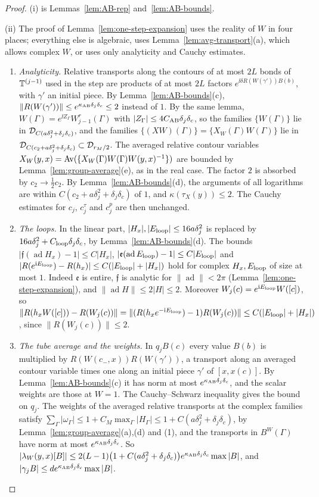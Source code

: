 \begin{proof}
(i) is Lemmas~\ref{lem:AB-rep} and~\ref{lem:AB-bounds}.

(ii) The proof of Lemma~\ref{lem:one-step-expansion} uses the reality of $W$ in four places; everything else is algebraic, uses Lemma~\ref{lem:avg-transport}(a), which allows complex $W$, or uses only analyticity and Cauchy estimates.
\begin{enumerate}[label=(\arabic*)]
\item \emph{Analyticity.} Relative transports along the contours of at most $2L$ bonds of $\mathbb T^{(j-1)}$ used in the step are products of at most $2L$ factors $e^{\ii\delta R(W(\gamma'))B(b)}$, with $\gamma'$ an initial piece. By Lemma~\ref{lem:AB-bounds}(c), $\|R(W(\gamma'))\|\le e^{\kappa_{\rm AB}\delta_j\delta_c}\le2$ instead of $1$. By the same lemma, $W(\Gamma)=e^{\ii Z_\Gamma}W^r_{j-1}(\Gamma)$ with $|Z_\Gamma|\le4C_{\rm AB}\delta_j\delta_c$, so the families $\{W(\Gamma)\}$ lie in $\mathcal D_{C(a\delta_j^2+\delta_j\delta_c)}$, and the families $\{(XW)(\Gamma)\}=\{X_W(\Gamma)W(\Gamma)\}$ lie in $\mathcal D_{C(c_2+a\delta_j^2+\delta_j\delta_c)}\subset\mathcal D_{r_M/2}$. The averaged relative contour variables $X_W(y,x)=\operatorname{Av}(\{X_W(\Gamma)W(\Gamma)W(y,x)^{-1}\})$ are bounded by Lemma~\ref{lem:group-average}(e), as in the real case. The factor $2$ is absorbed by $c_2\to\frac12c_2$. By Lemma~\ref{lem:AB-bounds}(d), the arguments of all logarithms are within $C(c_2+a\delta_j^2+\delta_j\delta_c)$ of $1$, and $\kappa(\tau_X(y))\le2$. The Cauchy estimates for $c_j$, $c^\tau_j$ and $c^p_j$ are then unchanged.
\item \emph{The loops.} In the linear part, $|H_x|,|E_{\rm loop}|\le16a\delta_j^2$ is replaced by $16a\delta_j^2+C_{\rm loop}\delta_j\delta_c$, by Lemma~\ref{lem:AB-bounds}(d). The bounds $|\mathfrak f(\operatorname{ad}H_x)-1|\le C|H_x|$, $|\mathfrak e(\operatorname{ad}E_{\rm loop})-1|\le C|E_{\rm loop}|$ and $|R(e^{\mathrm i E_{\rm loop}})-R(h_x)|\le C(|E_{\rm loop}|+|H_x|)$ hold for complex $H_x,E_{\rm loop}$ of size at most $1$. Indeed $\mathfrak e$ is entire, $\mathfrak f$ is analytic for $\|\operatorname{ad}\|<2\pi$ (Lemma~\ref{lem:one-step-expansion}), and $\|\operatorname{ad}H\|\le2|H|\le2$. Moreover $W_j(c)=e^{\mathrm i E_{\rm loop}}W([c])$, so $\|R(h_xW([c]))-R(W_j(c))\|=\|(R(h_xe^{-\mathrm i E_{\rm loop}})-1)R(W_j(c))\|\le C(|E_{\rm loop}|+|H_x|)$, since $\|R(W_j(c))\|\le2$.
\item \emph{The tube average and the weights.} In $q_jB(c)$ every value $B(b)$ is multiplied by $R(W(c_-,x))R(W(\gamma'))$, a transport along an averaged contour variable times one along an initial piece $\gamma'$ of $[x,x(c)]$. By Lemma~\ref{lem:AB-bounds}(c) it has norm at most $e^{\kappa_{\rm AB}\delta_j\delta_c}$, and the scalar weights are those at $W=1$. The Cauchy--Schwarz inequality gives the bound on $q_j$. The weights of the averaged relative transports at the complex families satisfy $\sum_\Gamma|\omega_\Gamma|\le1+C_M\max_\Gamma|H_\Gamma|\le1+C(a\delta_j^2+\delta_j\delta_c)$, by Lemma~\ref{lem:group-average}(a),(d) and (1), and the transports in $B^W(\Gamma)$ have norm at most $e^{\kappa_{\rm AB}\delta_j\delta_c}$. So $|\lambda_W(y,x)[B]|\le2(L-1)\big(1+C(a\delta_j^2+\delta_j\delta_c)\big)e^{\kappa_{\rm AB}\delta_j\delta_c}\max|B|$, and $|\gamma_jB|\le de^{\kappa_{\rm AB}\delta_j\delta_c}\max|B|$.

\end{enumerate}
\end{proof}
